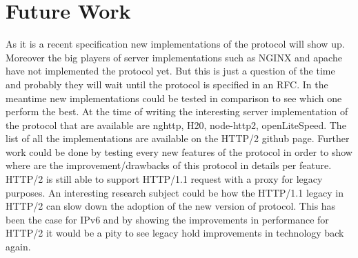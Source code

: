 \section{Future Work}
\label{furtherwork}

As it is a recent specification new implementations of the protocol will show up. Moreover the big players of server implementations such as NGINX\cite{nginx} and apache \cite{apache2} have not implemented the protocol yet. But this is just a question of the time and probably they will wait until the protocol is specified in an RFC. In the meantime new implementations could be tested in comparison to see which one perform the best. At the time of writing the interesting server implementation of the protocol that are available are nghttp, H20, node-http2, openLiteSpeed. The list of all the implementations are available on the HTTP/2 github page.\cite{http2-imp}
Further work could be done by testing every new features of the protocol in order to show where are the improvement/drawbacks of this protocol in details per feature. 
HTTP/2 is still able to support HTTP/1.1 request with a proxy for legacy purposes. An interesting research subject could be how the  HTTP/1.1 legacy in HTTP/2 can slow down the adoption of the new version of protocol. This has been the case for IPv6 and by showing the improvements in performance for HTTP/2 it would be a pity to see legacy hold improvements in technology back again.